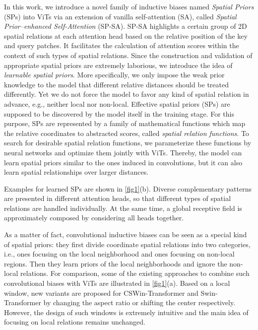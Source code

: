 \documentclass[authorversion, sigconf, acmthm=false, nonacm=true]{acmart}
\begin{document}
In this work, we introduce a novel family of inductive biases named \emph{Spatial Priors} (SPs) into ViTs 
via an extension of vanilla self-attention (SA), called \emph{Spatial Prior–enhanced Self-Attention} (SP-SA). 
SP-SA highlights a certain group of 2D spatial relations at each attention head based on the relative position of the key and query patches. It facilitates the calculation of attention scores within the context of such types of spatial relations. 
Since the construction and validation of appropriate spatial priors are extremely laborious, we introduce the idea of \emph{learnable spatial priors}.
More specifically, we only impose the weak prior knowledge to the model that different relative distances should be treated differently.
Yet we do not force the model to favor any kind of spatial relation in advance, e.g., neither local nor non-local. Effective spatial 
priors (SPs) are supposed to be discovered by the model itself in the training stage. 
For this purpose, 
SPs are represented by a family of mathematical functions which map the relative coordinates to
abstracted scores, called \emph{spatial relation functions}. To search for desirable spatial relation functions, 
we parameterize these functions by neural networks and optimize them jointly with ViTs. 
Thereby, the model can learn spatial priors similar to the ones induced in convolutions, but it can also learn spatial relationships over larger distances. 

Examples for learned SPs are shown in \cref{fig1}(b). Diverse complementary patterns are presented in different attention heads, so that 
different types of spatial relations are handled individually. At the same time, a global receptive field is approximately composed by considering all heads together.



As a matter of fact, convolutional inductive biases can be seen as a special kind of spatial priors: 
they first divide coordinate spatial relations into two categories, i.e., ones focusing on the local neighborhood and ones focusing on non-local regions. 
Then they learn priors of the local neighborhoods and ignore the non-local relations. 
For comparison, some of the existing approaches to combine such convolutional biases with ViTs are illustrated in \cref{fig1}(a).  
Based on a local window, new variants are proposed for CSWin-Transformer \cite{dong2021cswin} and Swin-Transformer \cite{liu2021swin} by changing the aspect ratio or shifting the center respectively.  
However, the design of such windows is extremely intuitive and the main idea of focusing on local relations remains unchanged.
\end{document}
